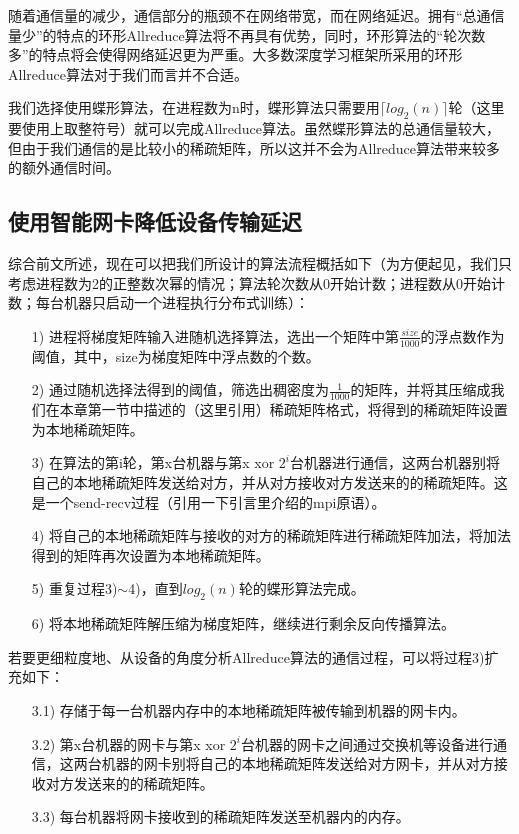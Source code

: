 随着通信量的减少，通信部分的瓶颈不在网络带宽，而在网络延迟。拥有“总通信量少”的特点的环形Allreduce算法将不再具有优势，同时，环形算法的“轮次数多”的特点将会使得网络延迟更为严重。大多数深度学习框架所采用的环形Allreduce算法对于我们而言并不合适。

我们选择使用蝶形算法，在进程数为n时，蝶形算法只需要用$\lceil log_2(n) \rceil$轮（这里要使用上取整符号）就可以完成Allreduce算法。虽然蝶形算法的总通信量较大，但由于我们通信的是比较小的稀疏矩阵，所以这并不会为Allreduce算法带来较多的额外通信时间。

\subsection{使用智能网卡降低设备传输延迟}
综合前文所述，现在可以把我们所设计的算法流程概括如下（为方便起见，我们只考虑进程数为2的正整数次幂的情况；算法轮次数从0开始计数；进程数从0开始计数；每台机器只启动一个进程执行分布式训练）：
\begin{itemize}
  \item [1)]
  进程将梯度矩阵输入进随机选择算法，选出一个矩阵中第$\frac{size}{1000}$的浮点数作为阈值，其中，size为梯度矩阵中浮点数的个数。
  \item [2)] 
  通过随机选择法得到的阈值，筛选出稠密度为$\frac{1}{1000}$的矩阵，并将其压缩成我们在本章第一节中描述的（这里引用）稀疏矩阵格式，将得到的稀疏矩阵设置为本地稀疏矩阵。
  \item [3)]
  在算法的第i轮，第x台机器与第x xor $2^i$台机器进行通信，这两台机器别将自己的本地稀疏矩阵发送给对方，并从对方接收对方发送来的的稀疏矩阵。这是一个send-recv过程（引用一下引言里介绍的mpi原语）。
  \item [4)]
  将自己的本地稀疏矩阵与接收的对方的稀疏矩阵进行稀疏矩阵加法，将加法得到的矩阵再次设置为本地稀疏矩阵。
  \item [5)]
  重复过程3)$\sim$4)，直到$log_2(n)$轮的蝶形算法完成。
  \item [6)]
  将本地稀疏矩阵解压缩为梯度矩阵，继续进行剩余反向传播算法。
\end{itemize}

若要更细粒度地、从设备的角度分析Allreduce算法的通信过程，可以将过程3)扩充如下：
\begin{itemize}
  \item [3.1)]
  存储于每一台机器内存中的本地稀疏矩阵被传输到机器的网卡内。
  \item [3.2)]
  第x台机器的网卡与第x xor $2^i$台机器的网卡之间通过交换机等设备进行通信，这两台机器的网卡别将自己的本地稀疏矩阵发送给对方网卡，并从对方接收对方发送来的的稀疏矩阵。
  \item [3.3)]
  每台机器将网卡接收到的稀疏矩阵发送至机器内的内存。
\end{itemize}


